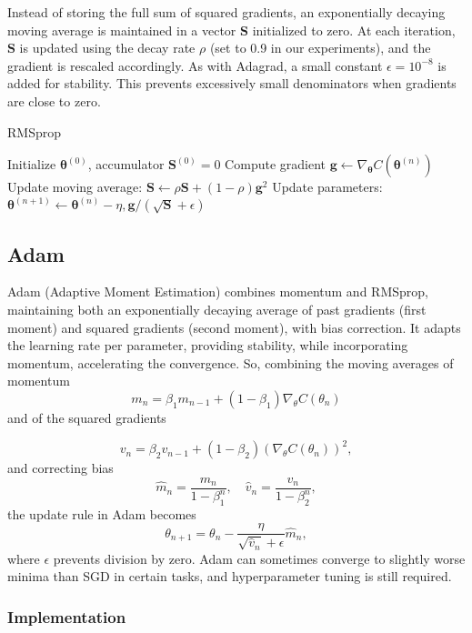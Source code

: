 \documentclass[
 reprint,            %
 amsmath,amssymb,
 aps,
]{revtex4-2}
\begin{document}
Instead of storing the full sum of squared gradients, an exponentially decaying moving average is maintained in a vector $\mathbf{S}$ initialized to zero.
At each iteration, $\mathbf{S}$ is updated using the decay rate $\rho$ (set to 0.9 in our experiments), and the gradient is rescaled accordingly.
As with Adagrad, a small constant $\epsilon=10^{-8}$ is added for stability.
This prevents excessively small denominators when gradients are close to zero.
\begin{algorithm}[H]
\caption{RMSprop}
\begin{algorithmic}[1]
\State Initialize $\boldsymbol{\theta}^{(0)}$, accumulator $\mathbf{S}^{(0)}=0$
\State Compute gradient $\mathbf{g} \gets \nabla_{\boldsymbol{\theta}} C(\boldsymbol{\theta}^{(n)})$
\State Update moving average: $\mathbf{S} \gets \rho \mathbf{S} + (1-\rho)\mathbf{g}^2$
\State Update parameters: $\boldsymbol{\theta}^{(n+1)} \gets \boldsymbol{\theta}^{(n)} - \eta , \mathbf{g} / (\sqrt{\mathbf{S}}+\epsilon)$
\EndFor
\end{algorithmic}
\end{algorithm}

\subsection{Adam}

Adam (Adaptive Moment Estimation) combines momentum and RMSprop, maintaining both an exponentially decaying average of past gradients (first moment) and squared gradients (second moment), with bias correction\cite{hjorthjensen_week37}.
It adapts the learning rate per parameter, providing stability, while incorporating momentum, accelerating the convergence.
So, combining the moving averages of momentum
\[
m_n = \beta_1 m_{n-1} + (1-\beta_1) \nabla_\theta C(\theta_n)
\]  
and of the squared gradients

\[
v_n = \beta_2 v_{n-1} + (1-\beta_2) (\nabla_\theta C(\theta_n))^2,
\]  
and correcting bias
\[
\hat{m}_n = \frac{m_n}{1-\beta_1^n}, \quad \hat{v}_n = \frac{v_n}{1-\beta_2^n},
\]  
the update rule in Adam becomes
\[
\theta_{n+1} = \theta_n - \frac{\eta}{\sqrt{\hat{v}_n}+\epsilon} \hat{m}_n,
\]  
where \(\epsilon\) prevents division by zero.
Adam can sometimes converge to slightly worse minima than SGD in certain tasks, and hyperparameter tuning is still required. \cite{goodfellow2016}

\subsubsection{Implementation}
\end{document}

